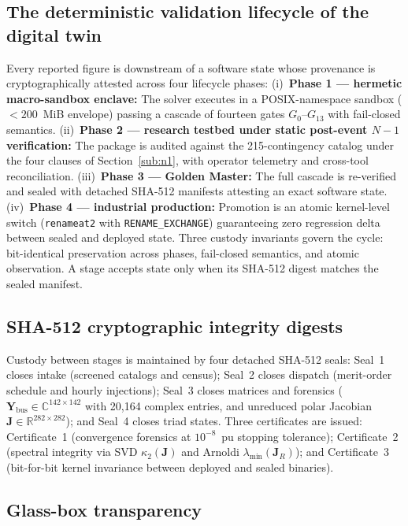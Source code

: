 \subsection{The deterministic validation lifecycle of the digital twin}
\label{sub:lifecycle}

Every reported figure is downstream of a software state whose provenance is cryptographically attested across four lifecycle phases:
(i)~\textbf{Phase 1 --- hermetic macro-sandbox enclave:} The solver executes in a POSIX-namespace sandbox ($<200$~MiB envelope) passing a cascade of fourteen gates $G_0$--$G_{13}$ with fail-closed semantics.
(ii)~\textbf{Phase 2 --- research testbed under static post-event $N-1$ verification:} The package is audited against the 215-contingency catalog under the four clauses of Section~\ref{sub:n1}, with operator telemetry and cross-tool reconciliation.
(iii)~\textbf{Phase 3 --- Golden Master:} The full cascade is re-verified and sealed with detached SHA-512 manifests attesting an exact software state.
(iv)~\textbf{Phase 4 --- industrial production:} Promotion is an atomic kernel-level switch (\texttt{renameat2} with \texttt{RENAME\_EXCHANGE}) guaranteeing zero regression delta between sealed and deployed state.
Three custody invariants govern the cycle: bit-identical preservation across phases, fail-closed semantics, and atomic observation. A stage accepts state only when its SHA-512 digest matches the sealed manifest.

\subsection{SHA-512 cryptographic integrity digests}
\label{sub:seals}

Custody between stages is maintained by four detached SHA-512 seals: Seal~1 closes intake (screened catalogs and census); Seal~2 closes dispatch (merit-order schedule and hourly injections); Seal~3 closes matrices and forensics ($\mathbf{Y}_{\mathrm{bus}}\in\mathbb{C}^{142\times 142}$ with 20,164 complex entries, and unreduced polar Jacobian $\mathbf{J}\in\mathbb{R}^{282\times 282}$); and Seal~4 closes triad states. Three certificates are issued: Certificate~1 (convergence forensics at $10^{-8}$~pu stopping tolerance); Certificate~2 (spectral integrity via SVD $\kappa_2(\mathbf{J})$ and Arnoldi $\lambda_{\min}(\mathbf{J}_R)$); and Certificate~3 (bit-for-bit kernel invariance between deployed and sealed binaries).

\subsection{Glass-box transparency}
\label{sub:glassbox}

